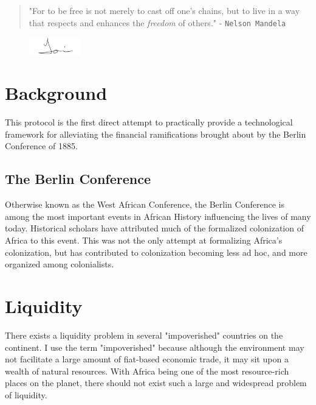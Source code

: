 \documentclass[10pt, titlepage, twocolumn]{report}
\begin{document}
\begin{quotation}
"For to be free is not merely to cast off one's chains, but to live in a way that respects and enhances the \textit{freedom} of others." - \texttt{Nelson Mandela}
\end{quotation}

\begin{figure}[ht]
\begin{flushright}
	\includegraphics[width=0.2\textwidth]{sig}	
	\end{flushright}
\end{figure}

\clearpage
\twocolumn




\section{Background}


\hspace*{15pt}
This protocol is the first direct attempt to practically provide a technological framework for alleviating the financial ramifications brought about by the Berlin Conference of 1885. 

\subsection{The Berlin Conference}
\hspace*{15pt}
Otherwise known as the West African Conference, the Berlin Conference \cite{A1}\cite{A2}\cite{A3} is among the most important events in African History influencing the lives of many today. Historical scholars have attributed much of the formalized colonization of Africa to this event. This was not the only attempt at formalizing Africa's colonization, but has contributed to colonization becoming less ad hoc, and more organized among colonialists. 


\section{Liquidity}
\hspace*{15pt}
There exists a liquidity problem in several "impoverished" countries on the continent. I use the term "impoverished" because although the environment may not facilitate a large amount of fiat-based economic trade, it may sit upon a wealth of natural resources. With Africa being one of the most resource-rich places on the planet, there should not exist such a large and widespread problem of liquidity. 
\end{document}
